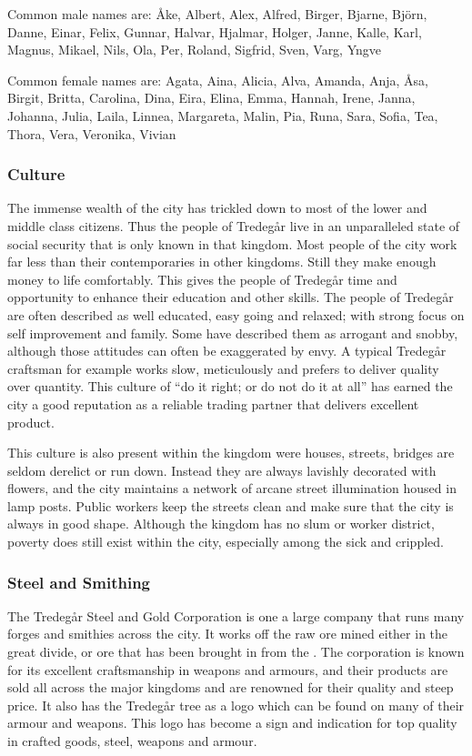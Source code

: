 Common male names are: Åke, Albert, Alex, Alfred, Birger, Bjarne, Björn, Danne,
Einar, Felix, Gunnar, Halvar, Hjalmar, Holger, Janne, Kalle, Karl, Magnus,
Mikael, Nils, Ola, Per, Roland, Sigfrid, Sven, Varg, Yngve

Common female names are: Agata, Aina, Alicia, Alva, Amanda, Anja, Åsa, Birgit,
Britta, Carolina, Dina, Eira, Elina, Emma, Hannah, Irene, Janna, Johanna,
Julia, Laila, Linnea, Margareta, Malin, Pia, Runa, Sara, Sofia, Tea, Thora,
Vera, Veronika, Vivian

\subsubsection{Culture}

The immense wealth of the city has trickled down to most of the lower and middle
class citizens. Thus the people of Tredegår live in an unparalleled state of
social security that is only known in that kingdom. Most people of the city
work far less than their contemporaries in other kingdoms. Still they make
enough money to life comfortably. This gives the people of Tredegår time and
opportunity to enhance their education and other skills. The people of Tredegår
are often described as well educated, easy going and relaxed; with strong focus
on self improvement and family. Some have described them as arrogant and snobby,
although those attitudes can often be exaggerated by envy. A typical Tredegår
craftsman for example works slow, meticulously and prefers to deliver quality
over quantity. This culture of ``do it right; or do not do it at all'' has
earned the city a good reputation as a reliable trading partner that delivers
excellent product.

This culture is also present within the kingdom were houses, streets, bridges
are seldom derelict or run down. Instead they are always lavishly decorated with
flowers, and the city maintains a network of arcane street illumination housed
in lamp posts. Public workers keep the streets clean and make sure that the
city is always in good shape. Although the kingdom has no slum or worker
district, poverty does still exist within the city, especially among the sick
and crippled.

\subsubsection{Steel and Smithing}

The Tredegår Steel and Gold Corporation is one a large company that
runs many forges and smithies across the city. It works off the raw ore mined
either in the great divide, or ore that has been brought in from the
. The corporation is known for its excellent
craftsmanship in weapons and armours, and their products are sold all across
the major kingdoms and are renowned for their quality and steep price. It also
has the Tredegår tree as a logo which can be found on many of their armour
and weapons. This logo has become a sign and indication for top quality in
crafted goods, steel, weapons and armour.

